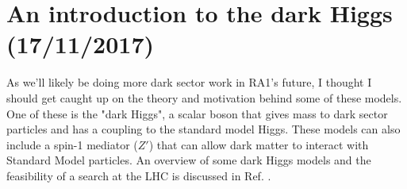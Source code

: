 \newpage
\section{An introduction to the dark Higgs (17/11/2017)}

As we'll likely be doing more dark sector work in RA1's future, I thought I should get caught up on the theory and motivation behind some of these models. One of these is the "dark Higgs", a scalar boson that gives mass to dark sector particles and has a coupling to the standard model Higgs. These models can also include a spin-1 mediator ($Z'$) that can allow dark matter to interact with Standard Model particles. An overview of some dark Higgs models and the feasibility of a search at the LHC is discussed in Ref. \cite{Duerr:2017uap}.